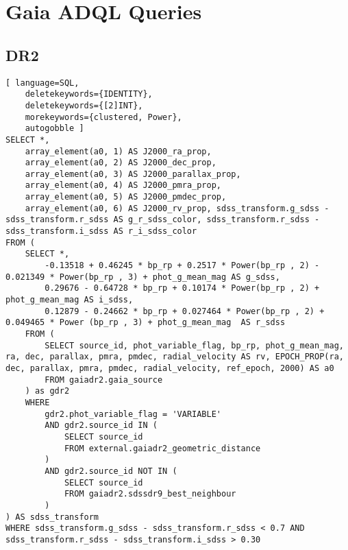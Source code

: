 \chapter{Gaia ADQL Queries} \label{apendice:gaiaAdql}

\section{DR2} \label{apendice:gaiaAdql:dr2}
\begin{lstlisting}[ language=SQL,
	deletekeywords={IDENTITY},
	deletekeywords={[2]INT},
	morekeywords={clustered, Power},
	autogobble ]
SELECT *, 
	array_element(a0, 1) AS J2000_ra_prop,
	array_element(a0, 2) AS J2000_dec_prop,
	array_element(a0, 3) AS J2000_parallax_prop,
	array_element(a0, 4) AS J2000_pmra_prop,
	array_element(a0, 5) AS J2000_pmdec_prop,
	array_element(a0, 6) AS J2000_rv_prop, sdss_transform.g_sdss - sdss_transform.r_sdss AS g_r_sdss_color, sdss_transform.r_sdss - sdss_transform.i_sdss AS r_i_sdss_color
FROM (
	SELECT *,
		-0.13518 + 0.46245 * bp_rp + 0.2517 * Power(bp_rp , 2) - 0.021349 * Power(bp_rp , 3) + phot_g_mean_mag AS g_sdss,
		0.29676 - 0.64728 * bp_rp + 0.10174 * Power(bp_rp , 2) + phot_g_mean_mag AS i_sdss,
		0.12879 - 0.24662 * bp_rp + 0.027464 * Power(bp_rp , 2) +	0.049465 * Power (bp_rp , 3) + phot_g_mean_mag	AS r_sdss
	FROM (
		SELECT source_id, phot_variable_flag, bp_rp, phot_g_mean_mag, ra, dec, parallax, pmra, pmdec, radial_velocity AS rv, EPOCH_PROP(ra, dec, parallax, pmra, pmdec, radial_velocity, ref_epoch, 2000) AS a0
		FROM gaiadr2.gaia_source
	) as gdr2
	WHERE
		gdr2.phot_variable_flag = 'VARIABLE'
		AND gdr2.source_id IN (
			SELECT source_id 
			FROM external.gaiadr2_geometric_distance
		)
		AND gdr2.source_id NOT IN (
			SELECT source_id 
			FROM gaiadr2.sdssdr9_best_neighbour
		)
) AS sdss_transform
WHERE sdss_transform.g_sdss - sdss_transform.r_sdss < 0.7 AND sdss_transform.r_sdss - sdss_transform.i_sdss > 0.30
\end{lstlisting}

